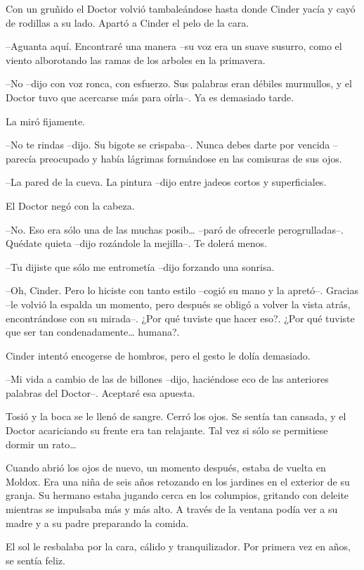 Con un gruñido el Doctor volvió tambaleándose hasta donde Cinder yacía y cayó de rodillas a su lado. Apartó a Cinder el pelo de la cara. 

--Aguanta aquí. Encontraré una manera --su voz era un suave susurro, como el viento alborotando las ramas de los arboles en la primavera.

--No --dijo con voz ronca, con esfuerzo. Sus palabras eran débiles murmullos, y el Doctor tuvo que acercarse más para oírla--. Ya es demasiado tarde.

La miró fijamente. 

--No te rindas --dijo. Su bigote se crispaba--. Nunca debes darte por vencida --parecía preocupado y había lágrimas formándose en las comisuras de sus ojos.

--La pared de la cueva. La pintura --dijo entre jadeos cortos y superficiales.

El Doctor negó con la cabeza. 

--No. Eso era sólo una de las muchas posib… --paró de ofrecerle perogrulladas--. Quédate quieta --dijo rozándole la mejilla--. Te dolerá menos.

--Tu dijiste que sólo me entrometía --dijo forzando una sonrisa.

--Oh, Cinder. Pero lo hiciste con tanto estilo --cogió su mano y la apretó--. Gracias --le volvió la espalda un momento, pero después se obligó a volver la vista atrás, encontrándose con su mirada--. ¿Por qué tuviste que hacer eso?. ¿Por qué tuviste que ser tan condenadamente… humana?.

Cinder intentó encogerse de hombros, pero el gesto le dolía demasiado. 

--Mi vida a cambio de las de billones --dijo, haciéndose eco de las anteriores palabras del Doctor--. Aceptaré esa apuesta.

Tosió y la boca se le llenó de sangre. Cerró los ojos. Se sentía tan cansada, y el Doctor acariciando su frente era tan relajante. Tal vez si sólo se permitiese dormir un rato…

Cuando abrió los ojos de nuevo, un momento después, estaba de vuelta en Moldox. Era una niña de seis años retozando en los jardines en el exterior de su granja. Su hermano estaba jugando cerca en los columpios, gritando con deleite mientras se impulsaba más y más alto. A través de la ventana podía ver a su madre y a su padre preparando la comida.

El sol le resbalaba por la cara, cálido y tranquilizador. Por primera vez en años, se sentía feliz.










